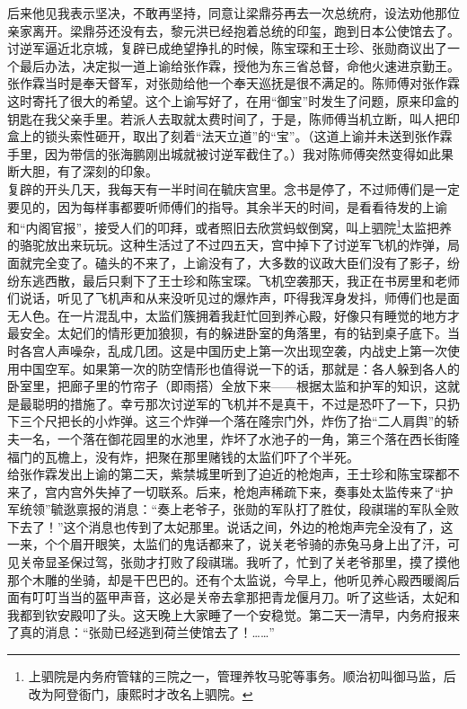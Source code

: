 后来他见我表示坚决，不敢再坚持，同意让梁鼎芬再去一次总统府，设法劝他那位亲家离开。梁鼎芬还没有去，黎元洪已经抱着总统的印玺，跑到日本公使馆去了。\\

讨逆军逼近北京城，复辟已成绝望挣扎的时候，陈宝琛和王士珍、张勋商议出了一个最后办法，决定拟一道上谕给张作霖，授他为东三省总督，命他火速进京勤王。张作霖当时是奉天督军，对张勋给他一个奉天巡抚是很不满足的。陈师傅对张作霖这时寄托了很大的希望。这个上谕写好了，在用“御宝”时发生了问题，原来印盒的钥匙在我父亲手里。若派人去取就太费时间了，于是，陈师傅当机立断，叫人把印盒上的锁头索性砸开，取出了刻着“法天立道”的“宝”。（这道上谕并未送到张作霖手里，因为带信的张海鹏刚出城就被讨逆军截住了。）我对陈师傅突然变得如此果断大胆，有了深刻的印象。\\

复辟的开头几天，我每天有一半时间在毓庆宫里。念书是停了，不过师傅们是一定要见的，因为每样事都要听师傅们的指导。其余半天的时间，是看看待发的上谕和“内阁官报”，接受人们的叩拜，或者照旧去欣赏蚂蚁倒窝，叫上驷院\footnote{上驷院是内务府管辖的三院之一，管理养牧马驼等事务。顺治初叫御马监，后改为阿登衙门，康熙时才改名上驷院。}太监把养的骆驼放出来玩玩。这种生活过了不过四五天，宫中掉下了讨逆军飞机的炸弹，局面就完全变了。磕头的不来了，上谕没有了，大多数的议政大臣们没有了影子，纷纷东逃西散，最后只剩下了王士珍和陈宝琛。飞机空袭那天，我正在书房里和老师们说话，听见了飞机声和从来没听见过的爆炸声，吓得我浑身发抖，师傅们也是面无人色。在一片混乱中，太监们簇拥着我赶忙回到养心殿，好像只有睡觉的地方才最安全。太妃们的情形更加狼狈，有的躲进卧室的角落里，有的钻到桌子底下。当时各宫人声噪杂，乱成几团。这是中国历史上第一次出现空袭，内战史上第一次使用中国空军。如果第一次的防空情形也值得说一下的话，那就是：各人躲到各人的卧室里，把廊子里的竹帘子（即雨搭）全放下来——根据太监和护军的知识，这就是最聪明的措施了。幸亏那次讨逆军的飞机并不是真干，不过是恐吓了一下，只扔下三个尺把长的小炸弹。这三个炸弹一个落在隆宗门外，炸伤了抬“二人肩舆”的轿夫一名，一个落在御花园里的水池里，炸坏了水池子的一角，第三个落在西长街隆福门的瓦檐上，没有炸，把聚在那里赌钱的太监们吓了个半死。\\

给张作霖发出上谕的第二天，紫禁城里听到了迫近的枪炮声，王士珍和陈宝琛都不来了，宫内宫外失掉了一切联系。后来，枪炮声稀疏下来，奏事处太监传来了“护军统领”毓逖禀报的消息：“奏上老爷子，张勋的军队打了胜仗，段祺瑞的军队全败下去了！”这个消息也传到了太妃那里。说话之间，外边的枪炮声完全没有了，这一来，个个眉开眼笑，太监们的鬼话都来了，说关老爷骑的赤兔马身上出了汗，可见关帝显圣保过驾，张勋才打败了段祺瑞。我听了，忙到了关老爷那里，摸了摸他那个木雕的坐骑，却是干巴巴的。还有个太监说，今早上，他听见养心殿西暖阁后面有叮叮当当的盔甲声音，这必是关帝去拿那把青龙偃月刀。听了这些话，太妃和我都到钦安殿叩了头。这天晚上大家睡了一个安稳觉。第二天一清早，内务府报来了真的消息：“张勋已经逃到荷兰使馆去了！……”\\

